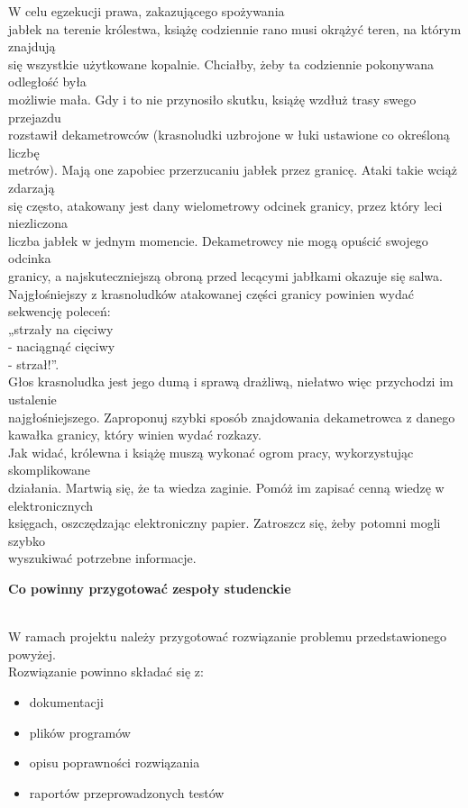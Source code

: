 \documentclass{article}
\begin{document}
W celu egzekucji prawa, zakazującego spożywania \\ jabłek na terenie królestwa, książę codziennie rano musi okrążyć teren, na którym znajdują \\ się wszystkie użytkowane kopalnie. Chciałby, żeby ta codziennie pokonywana odległość była \\ możliwie mała. Gdy i to nie przynosiło skutku, książę wzdłuż trasy swego przejazdu \\ rozstawił dekametrowców (krasnoludki uzbrojone w łuki ustawione co określoną liczbę \\ metrów). Mają one zapobiec przerzucaniu jabłek przez granicę. Ataki takie wciąż zdarzają \\ się często, atakowany jest dany wielometrowy odcinek granicy, przez który leci niezliczona \\ liczba jabłek w jednym momencie. Dekametrowcy nie mogą opuścić swojego odcinka \\ granicy, a najskuteczniejszą obroną przed lecącymi jabłkami okazuje się salwa. \\ Najgłośniejszy z krasnoludków atakowanej części granicy powinien wydać sekwencję poleceń: \\ „strzały na cięciwy \\ - naciągnąć cięciwy \\ - strzał!”. \\ Głos krasnoludka jest jego dumą i sprawą drażliwą, niełatwo więc przychodzi im ustalenie \\ najgłośniejszego. Zaproponuj szybki sposób znajdowania dekametrowca z danego \\ kawałka granicy, który winien wydać rozkazy. \\ Jak widać, królewna i książę muszą wykonać ogrom pracy, wykorzystując skomplikowane \\ działania. Martwią się, że ta wiedza zaginie. Pomóż im zapisać cenną wiedzę w elektronicznych \\ księgach, oszczędzając elektroniczny papier. Zatroszcz się, żeby potomni mogli szybko \\ wyszukiwać potrzebne informacje. \\
\centerline{\textbf{Co powinny przygotować zespoły studenckie}} \\
W ramach projektu należy przygotować rozwiązanie problemu przedstawionego powyżej. \\ Rozwiązanie powinno składać się z:
\begin{itemize}
\item dokumentacji
\item plików programów
\item opisu poprawności rozwiązania
\item raportów przeprowadzonych testów
\end{itemize}
\end{document}
